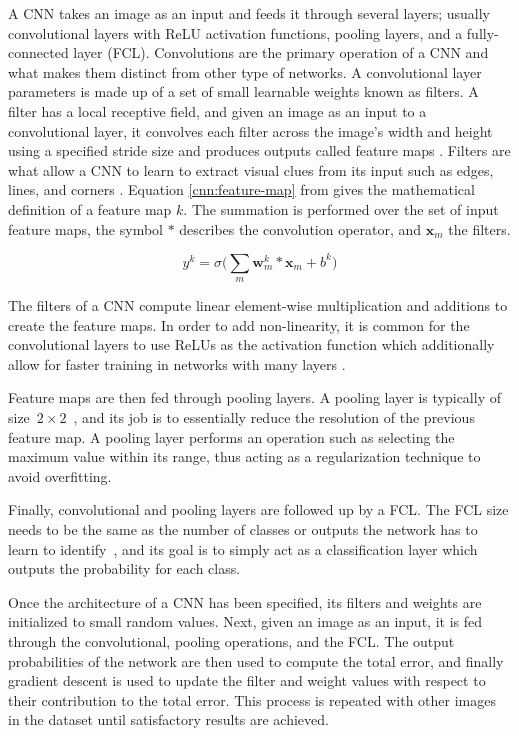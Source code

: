 A CNN takes an image as an input and feeds it through several layers; usually convolutional layers with ReLU activation functions, pooling layers, and a fully-connected layer (FCL). Convolutions are the primary operation of a CNN and what makes them distinct from other type of networks. A convolutional layer parameters is made up of a set of small learnable weights known as filters. A filter has a local receptive field, and given an image as an input to a convolutional layer, it convolves each filter across the image's width and height using a specified stride size and produces outputs called feature maps \cite{cnn-star-galaxy}. Filters are what allow a CNN to learn to extract visual clues from its input such as edges, lines, and corners \cite{Lecun99objectrecognition}. Equation \ref{cnn:feature-map} from \cite{cnn-star-galaxy} gives the mathematical definition of a feature map $k$. The summation is performed over the set of input feature maps, the symbol $*$ describes the convolution operator, and $\boldsymbol{x}_m$ the filters.

\begin{equation} \label{cnn:feature-map}
y^k = \sigma{\bigg(\sum_{m} \boldsymbol{w}^{k}_{m} * \boldsymbol{x}_m + b^k \bigg)}
\end{equation}

The filters of a CNN compute linear element-wise multiplication and additions to create the feature maps. In order to add non-linearity, it is common for the convolutional layers to use ReLUs as the activation function which additionally allow for faster training in networks with many layers \cite{cnn-star-galaxy}.

Feature maps are then fed through pooling layers. A pooling layer is typically of size~$2 \times 2$~\cite{NIPS2012_4824}, and  its job is to essentially reduce the resolution of the previous feature map. A pooling layer performs an operation such as selecting the maximum value within its range, thus acting as a regularization technique to avoid overfitting.

Finally, convolutional and pooling layers are followed up by a FCL. The FCL size needs to be the same as the number of classes or outputs the network has to learn to identify~\cite{Ciresan11flexible}, and its goal is to simply act as a classification layer which outputs the probability for each class.

Once the architecture of a CNN has been specified, its filters and weights are initialized to small random values. Next, given an image as an input, it is fed through the convolutional, pooling operations, and the FCL. The output probabilities of the network are then used to compute the total error, and finally gradient descent is used to update the filter and weight values with respect to their contribution to the total error. This process is repeated with other images in the dataset until satisfactory results are achieved.
